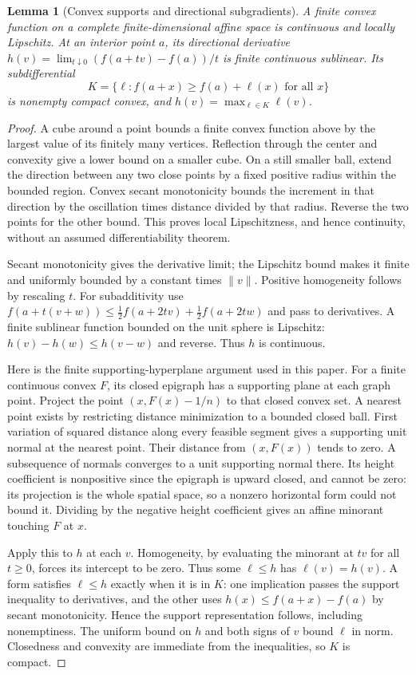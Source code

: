\documentclass[11pt]{article}
\newtheorem{lemma}[theorem]{Lemma}
\begin{document}
\begin{lemma}[Convex supports and directional subgradients]\label{convexfacts}
A finite convex function on a complete finite-dimensional affine space is continuous and locally Lipschitz. At an interior point $a$, its directional derivative $h(v)=\lim_{t\downarrow0}(f(a+tv)-f(a))/t$ is finite continuous sublinear. Its subdifferential
\[
 K=\{\ell:f(a+x)\geq f(a)+\ell(x)\text{ for all }x\}
\]
is nonempty compact convex, and $h(v)=\max_{\ell\in K}\ell(v)$.
\end{lemma}
\begin{proof}
A cube around a point bounds a finite convex function above by the largest value of its finitely many vertices. Reflection through the center and convexity give a lower bound on a smaller cube. On a still smaller ball, extend the direction between any two close points by a fixed positive radius within the bounded region. Convex secant monotonicity bounds the increment in that direction by the oscillation times distance divided by that radius. Reverse the two points for the other bound. This proves local Lipschitzness, and hence continuity, without an assumed differentiability theorem.

Secant monotonicity gives the derivative limit; the Lipschitz bound makes it finite and uniformly bounded by a constant times $\|v\|$. Positive homogeneity follows by rescaling $t$. For subadditivity use
$f(a+t(v+w))\leq\tfrac12 f(a+2tv)+\tfrac12f(a+2tw)$ and pass to derivatives. A finite sublinear function bounded on the unit sphere is Lipschitz: $h(v)-h(w)\leq h(v-w)$ and reverse. Thus $h$ is continuous.

Here is the finite supporting-hyperplane argument used in this paper. For a finite continuous convex $F$, its closed epigraph has a supporting plane at each graph point. Project the point $(x,F(x)-1/n)$ to that closed convex set. A nearest point exists by restricting distance minimization to a bounded closed ball. First variation of squared distance along every feasible segment gives a supporting unit normal at the nearest point. Their distance from $(x,F(x))$ tends to zero. A subsequence of normals converges to a unit supporting normal there. Its height coefficient is nonpositive since the epigraph is upward closed, and cannot be zero: its projection is the whole spatial space, so a nonzero horizontal form could not bound it. Dividing by the negative height coefficient gives an affine minorant touching $F$ at $x$.

Apply this to $h$ at each $v$. Homogeneity, by evaluating the minorant at $tv$ for all $t\geq0$, forces its intercept to be zero. Thus some $\ell\leq h$ has $\ell(v)=h(v)$. A form satisfies $\ell\leq h$ exactly when it is in $K$: one implication passes the support inequality to derivatives, and the other uses $h(x)\leq f(a+x)-f(a)$ by secant monotonicity. Hence the support representation follows, including nonemptiness. The uniform bound on $h$ and both signs of $v$ bound $\ell$ in norm. Closedness and convexity are immediate from the inequalities, so $K$ is compact.
\end{proof}
\end{document}
